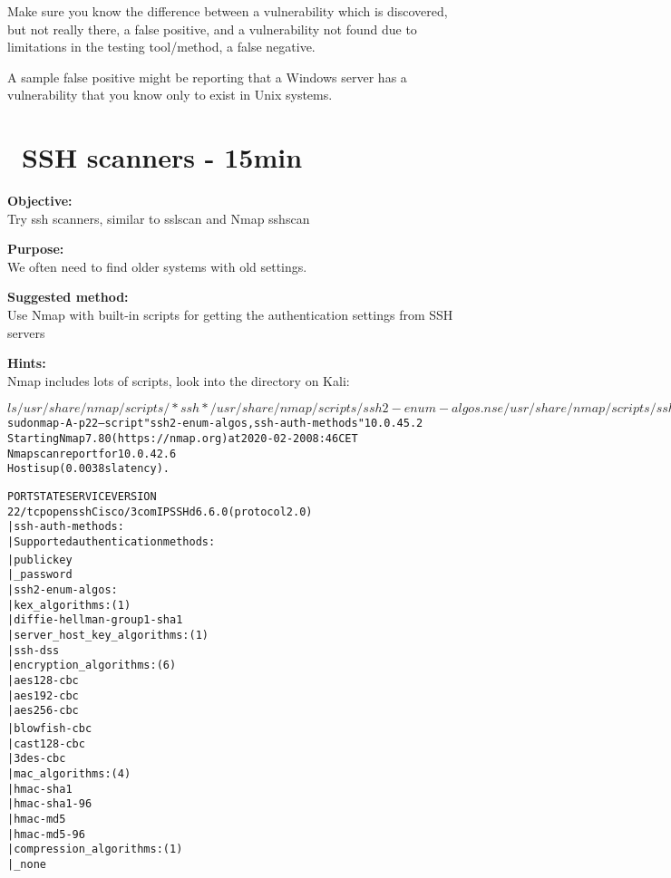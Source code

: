 \documentclass[a4paper,11pt,notitlepage]{report}
\begin{document}
Make sure you know the difference between a vulnerability which is discovered, but not really there, a false positive, and a vulnerability not found due to limitations in the testing tool/method, a false negative.

A sample false positive might be reporting that a Windows server has a vulnerability that you know only to exist in Unix systems.


\chapter{\faExclamationTriangle\ SSH scanners - 15min}
\label{ex:nmap-ssh-scanner}

{\bf Objective:}\\
Try ssh scanners, similar to sslscan and Nmap sshscan

{\bf Purpose:}\\
We often need to find older systems with old settings.

{\bf Suggested method:}\\
Use Nmap with built-in scripts for getting the authentication settings from SSH servers

{\bf Hints:}\\
Nmap includes lots of scripts, look into the directory on Kali:

\begin{alltt}\footnotesize
$ ls /usr/share/nmap/scripts/*ssh*
/usr/share/nmap/scripts/ssh2-enum-algos.nse   /usr/share/nmap/scripts/ssh-publickey-acceptance.nse
/usr/share/nmap/scripts/ssh-auth-methods.nse  /usr/share/nmap/scripts/ssh-run.nse
/usr/share/nmap/scripts/ssh-brute.nse	      /usr/share/nmap/scripts/sshv1.nse
/usr/share/nmap/scripts/ssh-hostkey.nse

$ sudo nmap -A -p 22 --script "ssh2-enum-algos,ssh-auth-methods" 10.0.45.2
Starting Nmap 7.80 ( https://nmap.org ) at 2020-02-20 08:46 CET
Nmap scan report for 10.0.42.6
Host is up (0.0038s latency).

PORT   STATE SERVICE VERSION
22/tcp open  ssh     Cisco/3com IPSSHd 6.6.0 (protocol 2.0)
| ssh-auth-methods:
|   Supported authentication methods:
|     publickey{\color{red}
|_    password}
| ssh2-enum-algos:
|   kex_algorithms: (1)
|       diffie-hellman-group1-sha1
|   server_host_key_algorithms: (1)
|       ssh-dss
|   encryption_algorithms: (6)
|       aes128-cbc
|       aes192-cbc
|       aes256-cbc
|       blowfish-cbc{\color{red}
|       cast128-cbc
|       3des-cbc}
|   mac_algorithms: (4)
|       hmac-sha1
|       hmac-sha1-96
|       hmac-md5
|       hmac-md5-96
|   compression_algorithms: (1)
|_      none
\end{alltt}
\end{document}
